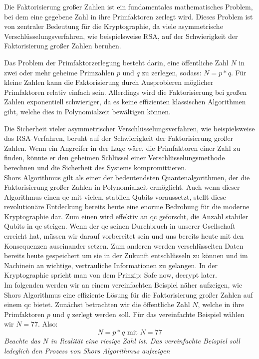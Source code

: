 Die Faktorisierung großer Zahlen \cite[S189]{bernsteinPostquantumCryptography2017} ist ein fundamentales mathematisches Problem, 
bei dem eine gegebene Zahl in ihre Primfaktoren zerlegt wird.
Dieses Problem ist von zentraler Bedeutung für die Kryptographie, da viele asymmetrische Verschlüsselungsverfahren, wie beispielsweise RSA, 
auf der Schwierigkeit der Faktorisierung großer Zahlen beruhen.

Das Problem der Primfaktorzerlegung besteht darin, eine öffentliche Zahl $N$ in zwei oder mehr geheime Primzahlen $p$ und $q$ zu zerlegen, sodass: $N = p*q$. 
Für kleine Zahlen kann die Faktorisierung durch Ausprobieren möglicher Primfaktoren relativ einfach sein. 
Allerdings wird die Faktorisierung bei großen Zahlen exponentiell schwieriger, 
da es keine effizienten klassischen Algorithmen gibt, welche dies in Polynomialzeit bewältigen können.

Die Sicherheit vieler asymmetrischer Verschlüsselungsverfahren, 
wie beispielsweise das RSA-Verfahren, beruht auf der Schwierigkeit der Faktorisierung großer Zahlen. 
Wenn ein Angreifer in der Lage wäre, die Primfaktoren einer Zahl zu finden, 
könnte er den geheimen Schlüssel einer Verschlüsselungsmethode berechnen und die Sicherheit des Systems kompromittieren.\\

Shors Algorithmus \cite{shorAlgorithmsQuantumComputation1994} gilt als einer der bedeutendsten Quantenalgorithmen, 
der die Faktorisierung großer Zahlen in Polynomialzeit ermöglicht. 
Auch wenn dieser Algorithmus einen \ac{qc} mit vielen, stabilen Qubits voraussetzt, 
stellt diese revolutionäre Entdeckung bereits heute eine enorme Bedrohung für die moderne Kryptographie dar.
Zum einen wird effektiv an \ac{qc} geforscht, die Anzahl stabiler Qubits in \ac{qc} steigen. 
Wenn der \ac{qc} seinen Durchbruch in unserer Gsellschaft erreicht hat, müssen wir darauf vorbereitet sein und uns bereits heute mit den Konsequenzen auseinander setzen. 
Zum anderen werden verschlüsselten Daten bereits heute gespeichert um sie in der Zukunft entschlüsseln zu können und 
im Nachinein an wichtige, vertrauliche Informationen zu gelangen. In der Kryptographie spricht man von dem Prinzip: \glqq Safe now, decrypt later\grqq.\\

Im folgenden \cite{kakLecture12PublicKey}\cite[S. 4-5]{gidneyHowFactor20482021} werden wir an einem vereinfachten Beispiel näher aufzeigen, 
wie Shors Algorithmus eine effiziente Lösung für die Faktorisierung großer Zahlen auf einem \ac{qc} bietet.
Zunächst betrachten wir die öffentliche Zahl $N$, welche in ihre Primfaktoren $p$ und $q$ zerlegt werden soll. 
Für das vereinfachte Beispiel wählen wir $N = 77$. Also: $$N = p*q \textrm{ mit } N= 77$$
\textit{Beachte das $N$ in Realität eine riesige Zahl ist. Das vereinfachte Beispiel soll ledeglich den Prozess von Shors Algorithmus aufzeigen}

